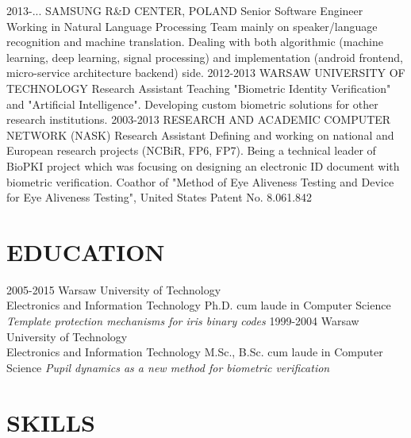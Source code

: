 \documentclass[]{mchcv}
\begin{document}
\begin{twenty}
  \twentyitem
    {2013-...}
    {SAMSUNG R\&D CENTER, POLAND}%
    {Senior Software Engineer}
    {Working in Natural Language Processing Team mainly on speaker/language recognition and machine translation. Dealing with both algorithmic (machine learning, deep learning, signal processing) and implementation (android frontend, micro-service architecture backend) side.}
  \twentyitem
    {2012-2013}
    {WARSAW UNIVERSITY OF TECHNOLOGY}%
    {Research Assistant}
	{Teaching "Biometric Identity Verification" and "Artificial Intelligence". Developing custom biometric solutions for other research institutions.}
  \twentyitem
    {2003-2013}
    {RESEARCH AND ACADEMIC COMPUTER NETWORK (NASK)}
    {Research Assistant}
    {Defining and working on national and European research projects (NCBiR, FP6, FP7). Being a technical leader of BioPKI project which was focusing on designing an electronic ID document with biometric verification. Coathor of "Method of Eye Aliveness Testing and Device for Eye Aliveness Testing", United States Patent No. 8.061.842}
\end{twenty}
\lineseparator

\section{EDUCATION}
\begin{twenty}
  \twentyitem
    {2005-2015}
    {Warsaw University of Technology\\ Electronics and Information Technology}
    {Ph.D. cum laude in Computer Science}
    {\textit{Template protection mechanisms for iris binary codes}}
  \twentyitem
    {1999-2004}
    {Warsaw University of Technology\\ Electronics and Information Technology}
    {M.Sc., B.Sc. cum laude in Computer Science}
    {\textit{Pupil dynamics as a new method for biometric verification}}
\end{twenty}
\lineseparator

\section{SKILLS}
\end{document}

